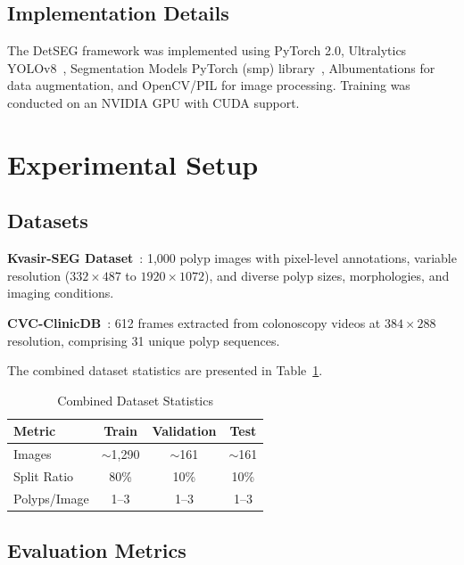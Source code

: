 \documentclass[conference]{IEEEtran}
\begin{document}
\subsection{Implementation Details}

The DetSEG framework was implemented using PyTorch 2.0, Ultralytics YOLOv8~\cite{jocher2023}, Segmentation Models PyTorch (smp) library~\cite{yakubovskiy2019}, Albumentations for data augmentation, and OpenCV/PIL for image processing. Training was conducted on an NVIDIA GPU with CUDA support.

\section{Experimental Setup}

\subsection{Datasets}

\textbf{Kvasir-SEG Dataset}~\cite{jha2020}: 1,000 polyp images with pixel-level annotations, variable resolution ($332\times487$ to $1920\times1072$), and diverse polyp sizes, morphologies, and imaging conditions.

\textbf{CVC-ClinicDB}~\cite{bernal2015}: 612 frames extracted from colonoscopy videos at $384\times288$ resolution, comprising 31 unique polyp sequences.

The combined dataset statistics are presented in Table~\ref{tab:dataset}.

\begin{table}[htbp]
\caption{Combined Dataset Statistics}
\label{tab:dataset}
\centering
\begin{tabular}{lccc}
\toprule
\textbf{Metric} & \textbf{Train} & \textbf{Validation} & \textbf{Test} \\
\midrule
Images & $\sim$1,290 & $\sim$161 & $\sim$161 \\
Split Ratio & 80\% & 10\% & 10\% \\
Polyps/Image & 1--3 & 1--3 & 1--3 \\
\bottomrule
\end{tabular}
\end{table}

\subsection{Evaluation Metrics}
\end{document}
